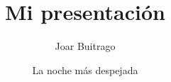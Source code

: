 \documentclass{beamer}
\title{Mi presentación}
\author{Joar Buitrago}
\date{La noche más despejada}
\begin{document}
    \begin{frame}
        \maketitle
    \end{frame}
\end{document}
